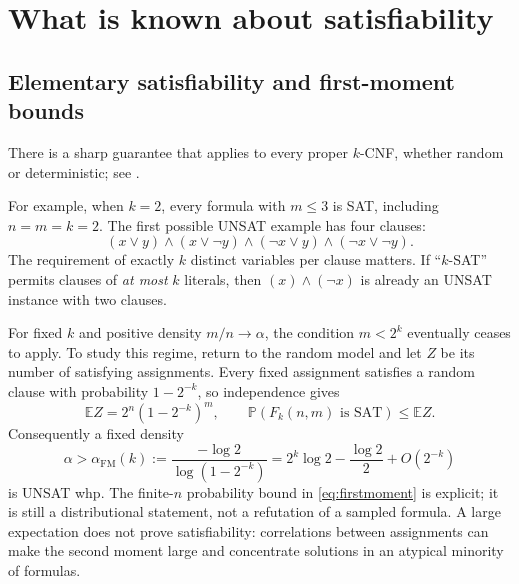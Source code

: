 \section{What is known about satisfiability}
\label{sec:thresholds}

\subsection{Elementary satisfiability and first-moment bounds}
There is a sharp guarantee that applies to every proper $k$-CNF, whether
random or deterministic; see \citet[Theorem A, p.~4]{bangjensen2023}.


For example, when $k=2$, every formula with $m\le3$ is SAT, including
$n=m=k=2$. The first possible UNSAT example has four clauses:
\[
 (x\lor y)\land(x\lor\neg y)\land(\neg x\lor y)
 \land(\neg x\lor\neg y).
\]
The requirement of exactly $k$ distinct variables per clause matters.
If ``$k$-SAT'' permits clauses of \emph{at most} $k$ literals, then
$(x)\land(\neg x)$ is already an UNSAT instance with two clauses.

For fixed $k$ and positive density $m/n\to\alpha$, the condition $m<2^k$
eventually ceases to apply. To study this regime, return to the random model
and let $Z$ be its number of satisfying assignments. Every fixed assignment
satisfies a random clause with probability $1-2^{-k}$, so independence gives
\begin{equation}
 \mathbb E Z=2^n(1-2^{-k})^m,
 \qquad \mathbb P(F_k(n,m)\text{ is SAT})\le \mathbb E Z.
 \label{eq:firstmoment}
\end{equation}
Consequently a fixed density
\begin{equation}
 \alpha>\alpha_{\mathrm{FM}}(k):=
 \frac{-\log2}{\log(1-2^{-k})}
 =2^k\log2-\frac{\log2}{2}+O(2^{-k})
 \label{eq:fmthreshold}
\end{equation}
is UNSAT whp. The finite-$n$ probability bound in
\eqref{eq:firstmoment} is explicit; it is still a distributional statement,
not a refutation of a sampled formula. A large expectation does not prove
satisfiability: correlations between assignments can make the second moment
large and concentrate solutions in an atypical minority of formulas.

